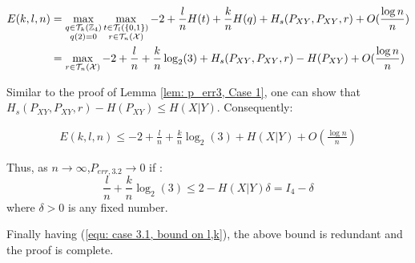  \begin{align*}
E(k,l,n)&= \max_{\substack{q\in \mathcal{T}_k(\mathbb{Z}_4)\\q(2)=0}} \max_{\substack{t\in \mathcal{T}_l(\{0,1 \})\\ r \in \mathcal{T}_n(\mathcal{X})}} -2+\frac{l}{n} H(t)+\frac{k}{n}H(q)+H_{s}(P_{XY},P_{XY},r)+O( \frac{\log n}{n})\\
&= \max_{\substack{r \in \mathcal{T}_n(\mathcal{X})}} -2+\frac{l}{n} +\frac{k}{n}\log_2(3)+H_{s}(P_{XY},P_{XY},r)-H(P_{XY})+O( \frac{\log n}{n})
\end{align*}

Similar to the proof of Lemma \ref{lem: p_err3, Case 1}, one can show that $H_{s}(P_{XY},P_{XY},r)-H(P_{XY}) \leq H(X|Y)$. Consequently:

 \begin{align*}
E(k,l,n)\leq -2+\frac{l}{n} +\frac{k}{n}\log_2(3)+H(X|Y)+O( \frac{\log n}{n})
\end{align*}

Thus, as $n\rightarrow \infty$,$P_{err, 3.2}\rightarrow 0$ if :
\begin{equation} \label{equ: case 3.2, bound on l,k}
\frac{l}{n} +\frac{k}{n}\log_2(3) \leq 2-H(X|Y)\delta=I_4-\delta 
\end{equation} 
where $\delta >0$ is any fixed number.

Finally having (\ref{equ: case 3.1, bound on l,k}), the above bound is redundant and the proof is complete.
